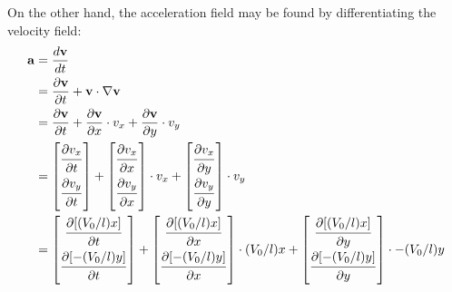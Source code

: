 \documentclass{article}
\begin{document}
\noindent On the other hand, the acceleration field may be found by differentiating the velocity field:
\begin{align*}
    \mathbf{a} &= \frac{d\mathbf{v}}{dt} \\
    &= \frac{\partial\mathbf{v}}{\partial t} + \mathbf{v} \cdot \nabla \mathbf{v} \\
    &= \frac{\partial\mathbf{v}}{\partial t} + \frac{\partial\mathbf{v}}{\partial x} \cdot v_x + \frac{\partial\mathbf{v}}{\partial y} \cdot v_y \\
    &= \begin{bmatrix}
        \dfrac{\strut\partial v_x}{\strut\partial t}
        \\
        \dfrac{\strut\partial v_y}{\strut\partial t}
       \end{bmatrix}
       +
       \begin{bmatrix}
        \dfrac{\strut\partial v_x}{\strut\partial x}
        \\
        \dfrac{\strut\partial v_y}{\strut\partial x}
       \end{bmatrix} \cdot v_x
       +
       \begin{bmatrix}
        \dfrac{\strut\partial v_x}{\strut\partial y}
        \\
        \dfrac{\strut\partial v_y}{\strut\partial y}
       \end{bmatrix} \cdot v_y
       \\
    &= \begin{bmatrix}
        \dfrac{\strut\partial [(V_0 / l)x]}{\strut\partial t}
        \\
        \dfrac{\strut\partial [-(V_0 / l)y]}{\strut\partial t}
       \end{bmatrix}
       +
       \begin{bmatrix}
        \dfrac{\strut\partial [(V_0 / l)x]}{\strut\partial x}
        \\
        \dfrac{\strut\partial [-(V_0 / l)y]}{\strut\partial x}
       \end{bmatrix} \cdot (V_0 / l)x
       +
       \begin{bmatrix}
        \dfrac{\strut\partial [(V_0 / l)x]}{\strut\partial y}
        \\
        \dfrac{\strut\partial [-(V_0 / l)y]}{\strut\partial y}
       \end{bmatrix} \cdot -(V_0 / l)y
       \\

\end{align*}
\end{document}

